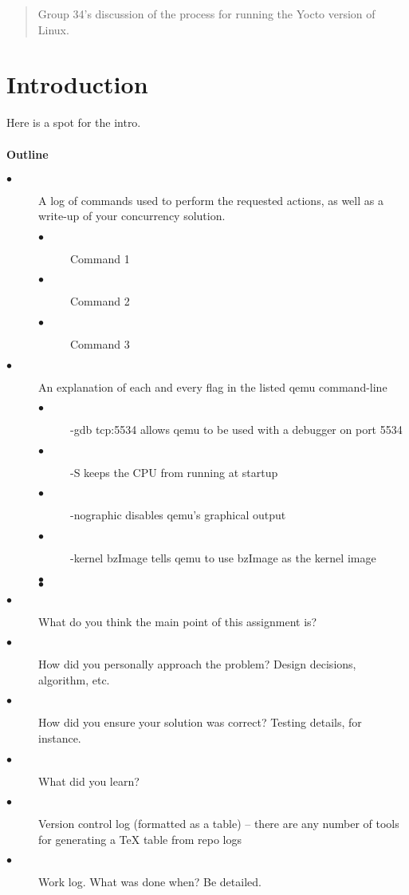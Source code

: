 \documentclass[titlepage]{article}
\begin{document}
\maketitle

\begin{abstract}
Group 34's discussion of the process for running the Yocto version of Linux.
\end{abstract}

\section{Introduction}
Here is a spot for the intro.

\paragraph{Outline}

\begin{description}
  \item[$\bullet$] A log of commands used to perform the requested actions, as well as a write-up of your concurrency solution.
  \begin{description}
    \item[$\bullet$] Command 1
    \item[$\bullet$] Command 2
    \item[$\bullet$] Command 3
  \end{description}
  \item[$\bullet$] An explanation of each and every flag in the listed qemu command-line
  \begin{description}
    \item[$\bullet$] -gdb tcp:5534 allows qemu to be used with a debugger on port 5534
    \item[$\bullet$] -S keeps the CPU from running at startup
    \item[$\bullet$] -nographic disables qemu's graphical output
    \item[$\bullet$] -kernel bzImage tells qemu to use bzImage as the kernel image
    \item[$\bullet$] 
    \item[$\bullet$] 
  \end{description}
  \item[$\bullet$] What do you think the main point of this assignment is?
  \item[$\bullet$] How did you personally approach the problem? Design decisions, algorithm, etc.
  \item[$\bullet$] How did you ensure your solution was correct? Testing details, for instance.
  \item[$\bullet$] What did you learn?
  \item[$\bullet$] Version control log (formatted as a table) -- there are any number of tools for generating a TeX table from repo logs
  \item[$\bullet$] Work log. What was done when? Be detailed.
\end{description}
\end{document}
